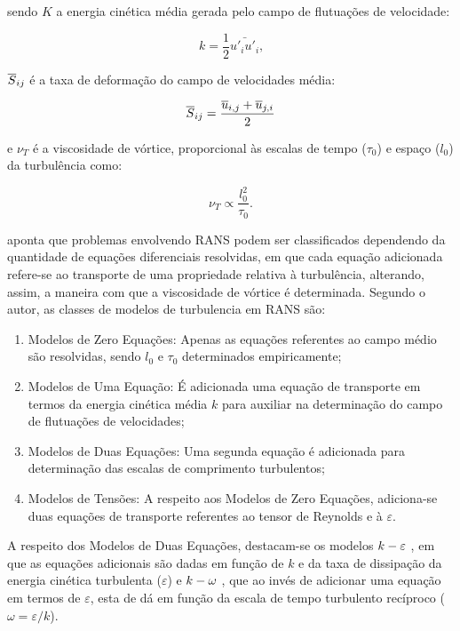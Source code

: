 \documentclass[_ArquivoPrincipal.tex]{subfiles}
\begin{document}
\noindent sendo $K$ a energia cinética média gerada pelo campo de flutuações de velocidade:

\begin{equation}
    k=\frac{1}{2}\bar{u'_iu'_i}\text{,}
\end{equation}

\noindent $\overline{S}_{ij}$ é a taxa de deformação do campo de velocidades média:

\begin{equation}
    \overline{S}_{ij}=\frac{\overline{u}_{i,j}+\overline{u}_{j,i}}{2}
\end{equation}

\noindent e $\nu_T$ é a viscosidade de vórtice, proporcional às escalas de tempo ($\tau_0$) e espaço ($l_0$) da turbulência como:

\begin{equation}
    \nu_T\propto\frac{l_0^2}{\tau_0}\text{.}
\end{equation}

 aponta que problemas envolvendo RANS podem ser classificados dependendo da quantidade de equações diferenciais resolvidas, em que cada equação adicionada refere-se ao transporte de uma propriedade relativa à turbulência, alterando, assim, a maneira com que a viscosidade de vórtice é determinada. Segundo o autor, as classes de modelos de turbulencia em RANS são:

\begin{enumerate}[label=\alph*.]
    \item Modelos de Zero Equações: Apenas as equações referentes ao campo médio são resolvidas, sendo $l_0$ e $\tau_0$ determinados empiricamente;
    \item Modelos de Uma Equação: É adicionada uma equação de transporte em termos da energia cinética média $k$ para auxiliar na determinação do campo de flutuações de velocidades;
    \item Modelos de Duas Equações: Uma segunda equação é adicionada para determinação das escalas de comprimento turbulentos;
    \item Modelos de Tensões: A respeito aos Modelos de Zero Equações, adiciona-se duas equações de transporte referentes ao tensor de Reynolds e à $\varepsilon$.
\end{enumerate}

A respeito dos Modelos de Duas Equações, destacam-se os modelos $k-\varepsilon$ \cite{haakansson2012experimental,davidson2014pans,parente2011improved}, em que as equações adicionais são dadas em função de $k$ e da taxa de dissipação da energia cinética turbulenta ($\varepsilon$) e $k-\omega$ \cite{larsen2018over,bassi2005discontinuous}, que ao invés de adicionar uma equação em termos de $\varepsilon$, esta de dá em função da escala de tempo turbulento recíproco ($\omega=\varepsilon/k$).
\end{document}
